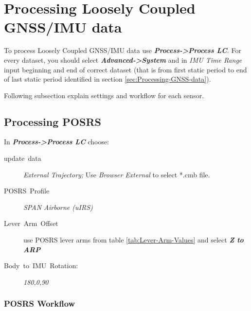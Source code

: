 \documentclass[british]{book}
\begin{document}


\section{Processing Loosely Coupled GNSS/IMU data\label{sec:Processing-Loosely-Coupled}}

To process  Loosely Coupled GNSS/IMU data use \textbf{\emph{Process->Process LC}}. For every dataset, you should select \textbf{\emph{Advanced->System}} and in \textit{IMU Time Range} input beginning and end of correct dataset (that is from first static period to end of last static period identified in section \ref{sec:Processing-GNSS-data}).


Following subsection explain settings and workflow for each sensor.

\subsection{Processing POSRS\label{sub:Processing-POSRS}}

In \textbf{\emph{Process->Process LC}} choose:
\begin{description}
	\item [{update~data}] \emph{External Trajectory; }Use \emph{Browser External} to select {*}.cmb file.
	\item [{POSRS~Profile}] \emph{SPAN Airborne (uIRS)}
	\item [{Lever~Arm~Offset}] use POSRS lever arms from table \ref{tab:Lever-Arm-Values} and select \textbf{\emph{Z to ARP}}
	\item [{Body~to~IMU~Rotation:}] \emph{180,0,90 }
	\end{description}
	
\subsubsection{POSRS Workflow\label{sub:POSRS-Workflow}}
\end{document}
